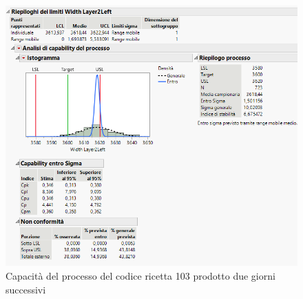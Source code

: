\begin{figure}[h]
  \centering
  \includegraphics[width=1 \textwidth]{img/Rec-103-Capability.png}
  \caption{Capacità del processo del codice ricetta 103 prodotto due giorni successivi}
  \label{fig:Rec-103-Capability.png}
\end{figure}



% 

